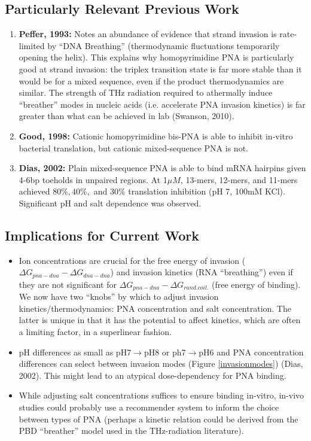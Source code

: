 \documentclass[a4paper,12pt]{article}
\begin{document}
\subsection{Particularly Relevant Previous Work}
\begin{enumerate}
\item {\bf Peffer, 1993:} Notes an abundance of evidence that strand invasion is rate-limited by ``DNA Breathing'' (thermodynamic fluctuations temporarily opening the helix). This explains why homopyrimidine PNA is particularly good at strand invasion: the triplex transition state is far more stable than it would be for a mixed sequence, even if the product thermodynamics are similar. The strength of THz radiation required to athermally induce ``breather'' modes in nucleic acids (i.e. accelerate PNA invasion kinetics) is far greater than what can be achieved in lab (Swanson, 2010).
\item {\bf Good, 1998:} Cationic homopyrimidine bis-PNA is able to inhibit in-vitro bacterial translation, but cationic mixed-sequence PNA is not. 
\item {\bf Dias, 2002:} Plain mixed-sequence PNA is able to bind mRNA hairpins given 4-6bp toeholds in unpaired regions. At 1$\mu M$, 13-mers, 12-mers, and 11-mers achieved $80\%, 40\%,$ and $30\%$ translation inhibition (pH 7, 100mM KCl). Significant pH and salt dependence was observed.
\end{enumerate}

\subsection{Implications for Current Work}
\begin{itemize}
\item Ion concentrations are crucial for the free energy of invasion ($\Delta G_{pna-dna}-\Delta G_{dna-dna}$) and invasion kinetics (RNA ``breathing'') even if they are not significant for $\Delta G_{pna-dna}-\Delta G_{rand.coil.}$ (free energy of binding). We now have two ``knobs'' by which to adjust invasion kinetics/thermodynamics: PNA concentration and salt concentration. The latter is unique in that it has the potential to affect kinetics, which are often a limiting factor, in a superlinear fashion.
\item pH differences as small as pH7$\rightarrow$pH8 or ph7$\rightarrow$pH6 and PNA concentration differences can select between invasion modes (Figure \ref{invasionmodes}) (Dias, 2002). This might lead to an atypical dose-dependency for PNA binding.
\item While adjusting salt concentrations suffices to ensure binding in-vitro, in-vivo studies could probably use a recommender system to inform the choice between types of PNA (perhaps a kinetic relation could be derived from the PBD ``breather'' model used in the THz-radiation literature).
\end{itemize}
\end{document}
